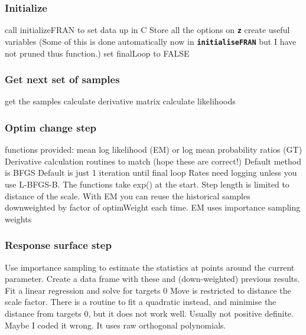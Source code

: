 \documentclass[12pt, a4paper]{article}
\renewcommand{\=}{\,=\,}
\newcommand{\+}{\,+\,}
\newcommand{\sfn}[1]{\textbf{\texttt{#1}}}
\begin{document}
\subsubsection{Initialize}
\label{sec:init}
\begin{algorithmic}
\STATE call initializeFRAN to set data up in C
\STATE Store all the options on \sfn{z}
\STATE create useful variables (Some of this is done automatically now in
  \sfn{initialiseFRAN} but I have not pruned thus function.)
\STATE set finalLoop to FALSE
\end{algorithmic}
\subsubsection{Get next set of samples}
\label{sec:samples}
\begin{algorithmic}
\STATE get the samples
\STATE calculate derivative matrix
\STATE calculate likelihoods
\end{algorithmic}
\subsubsection{Optim change step}
\label{sec:optim}
\begin{algorithmic}
 functions provided: mean log likelihood (EM) or log mean
probability ratios (GT) 
\STATE Derivative calculation routines to match (hope these are correct!)
\STATE Default method is BFGS 
\STATE Default is just 1 iteration until final loop
\STATE Rates need logging unless you use L-BFGS-B. The functions take exp() at
the start.
\STATE Step length is limited to distance of the scale.
\STATE With EM you can reuse the historical samples downweighted by factor of
optimWeight each time. 
\STATE EM uses importance sampling weights 
\end{algorithmic}
\subsubsection{Response surface step}
\label{sec:resp}
\begin{algorithmic}
\STATE Use importance sampling to estimate the statistics at points around the
current parameter. 
\STATE Create a data frame with these and (down-weighted) previous results.
\STATE Fit a linear regression and solve for targets 0
\STATE Move is restricted to distance the scale factor.
\STATE There is a routine to fit a quadratic instead, and minimise the distance
from targets 0, but it does not work well. Usually not positive definite. Maybe
I coded it wrong. It uses raw orthogonal polynomials.
\end{algorithmic}
\end{document}
